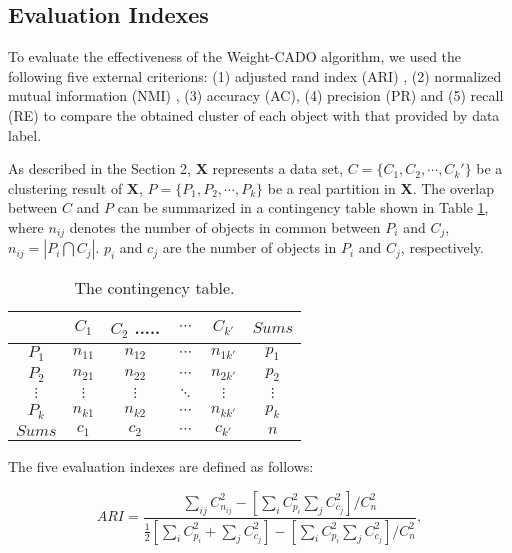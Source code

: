 \documentclass[review]{elsarticle}
\begin{document}
\subsection{Evaluation Indexes}
To evaluate the effectiveness of the Weight-CADO algorithm, we used the following five external criterions: (1) adjusted rand index (ARI) \cite{LiangJY2012means}, (2) normalized mutual information (NMI) \cite{strehl2003cluster}, (3) accuracy (AC), (4) precision (PR) and (5) recall (RE) to compare the obtained cluster of each object with that provided by data label.

As described in the Section 2, $\textbf{X}$ represents a data set, $C=\{C_1,C_2,\cdots,C_k'\}$ be a clustering result of $\textbf{X}$, $P=\{P_1,P_2,\cdots,P_k\}$ be a real partition in $\textbf{X}$. The overlap between $C$ and $P$ can be summarized in a contingency table shown in Table \ref{tab-cont}, where $n_{ij}$ denotes the number of objects in common between $P_i$ and $C_j$, $n_{ij}=|P_i \bigcap C_j|$. $p_i$ and $c_j$ are the number of objects in $P_i$ and $C_j$, respectively.
\begin{table}[!h]
\centering

\caption{The contingency table.}
\label{tab-cont}
\begin{tabular}{cccccc}
\hline\noalign{\smallskip}
  &  $C_1$ & $C_2$ .....& $\cdots$ & $C_{k'}$ & $Sums$\\
\hline
$P_1$ & $n_{11}$ & $n_{12}$ &  $\cdots$ & $n_{1k'}$  & $p_1$\\

$P_2$     & $n_{21}$ & $n_{22}$ &  $\cdots$ & $n_{2k'}$  & $p_2$\\

$\vdots$  & $\vdots$ & $\vdots$ &  $\ddots$ & $\vdots$  & $\vdots$\\

$P_k$  & $n_{k1}$ & $n_{k2}$ & $\cdots$ & $n_{kk'}$  & $p_{k}$\\

$Sums$      & $c_1$     &  $c_2$    & $\cdots$ & $c_{k'}$  & $n$ \\

\hline
\end{tabular}
\end{table}

The five evaluation indexes are defined as follows:

$$ARI=\frac{\sum_{ij}C_{n_{ij}}^{2}-[\sum_i C_{p_i}^2 \sum_j  C_{c_j}^2]/C_n^2}
{\frac{1}{2}[\sum_i C_{p_i}^2+\sum_j C_{c_j}^2]-[\sum_iC_{p_i}^2 \sum_j C_{c_j}^2]/C_n^2},$$
\end{document}
